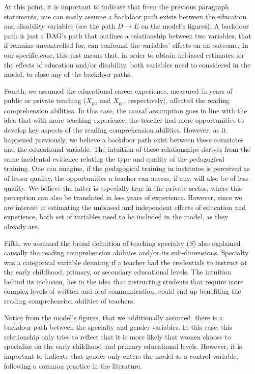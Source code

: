 At this point, it is important to indicate that from the previous paragraph statements, one can easily assume a backdoor path exists between the education and disability variables (see the path $D \rightarrow E$ on the model's figures). A backdoor path is just a DAG's path that outlines a relationship between two variables, that if remains uncontrolled for, can confound the variables' effects on an outcome. In our specific case, this just means that, in order to obtain unbiased estimates for the effects of education and/or disability, both variables need to considered in the model, to close any of the backdoor paths.

Fourth, we assumed the educational career experience, measured in years of public or private teaching ($X_{pu}$ and $X_{pr}$, respectively), affected the reading comprehension abilities. In this case, the causal assumption goes in line with the idea that with more teaching experience, the teacher had more opportunities to develop key aspects of the reading comprehension abilities. However, as it happened previously, we believe a backdoor path exist between these covariates and the educational variable. The intuition of these relationships derives from the same incidental evidence relating the type and quality of the pedagogical training. One can imagine, if the pedagogical training in institutes is perceived as of lesser quality, the opportunities a teacher can access, if any, will also be of less quality. We believe the latter is especially true in the private sector, where this perception can also be translated in less years of experience. However, since we are interest in estimating the unbiased and independent effects of education and experience, both set of variables need to be included in the model, as they already are.

Fifth, we assumed the broad definition of teaching specialty ($S$) also explained causally the reading comprehension abilities and/or its sub-dimensions. Specialty was a categorical variable denoting if a teacher had the credentials to instruct at the early childhood, primary, or secondary educational levels. The intuition behind its inclusion, lies in the idea that instructing students that require more complex levels of written and oral communication, could end up benefiting the reading comprehension abilities of teachers. 

Notice from the model's figures, that we additionally assumed, there is a backdoor path between the specialty and gender variables. In this case, this relationship only tries to reflect that it is more likely that women choose to specialize on the early childhood and primary educational levels. However, it is important to indicate that gender only enters the model as a control variable, following a common practice in the literature.

